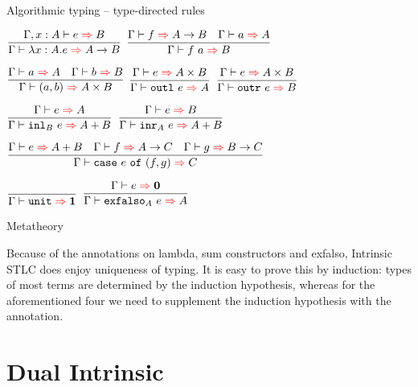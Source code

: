 \documentclass{beamer}
\newcommand{\Fun}[2]{#1 \to #2}
\newcommand{\Prod}[2]{#1 \times #2}
\newcommand{\Sum}[2]{#1 + #2}
\newcommand{\Unit}{\textbf{1}}
\newcommand{\Empty}{\textbf{0}}
\newcommand{\app}[2]{#1\ #2}
\newcommand{\pair}[2]{(#1, #2)}
\newcommand{\outl}[1][]{\texttt{outl}\ #1}
\newcommand{\outr}[1][]{\texttt{outr}\ #1}
\newcommand{\case}[3]{\texttt{case}\ #1\ \texttt{of}\ (#2, #3)}
\newcommand{\unit}{\texttt{unit}}
\newcommand{\infrule}[3][]{\displaystyle \frac{#2}{#3} \textsc{\footnotesize{#1}}}
\newcommand{\extend}[3]{#1, #2 : #3}
\begin{document}
\begin{frame}{Algorithmic typing -- type-directed rules}

\begin{center}
  $\infrule{\fullinfer{\extend{\Gamma}{x}{A}}{e}{B}}{\infer{\ifun{x}{A}{e}}{\Fun{A}{B}}}$ \quad
  $\infrule{\infer{f}{\Fun{A}{B}} \quad \infer{a}{A}}{\infer{\app{f}{a}}{B}}$

  \vspace{2em}

  $\infrule{\infer{a}{A} \quad \infer{b}{B}}{\infer{\pair{a}{b}}{\Prod{A}{B}}}$ \quad
  $\infrule{\infer{e}{\Prod{A}{B}}}{\infer{\outl[e]}{A}}$ \quad
  $\infrule{\infer{e}{\Prod{A}{B}}}{\infer{\outr[e]}{B}}$

  \vspace{2em}

  $\infrule{\infer{e}{A}}{\infer{\iinl{B}{e}}{\Sum{A}{B}}}$ \quad
  $\infrule{\infer{e}{B}}{\infer{\iinr{A}{e}}{\Sum{A}{B}}}$

  \vspace{2em}

  $\infrule{\infer{e}{\Sum{A}{B}} \quad \infer{f}{\Fun{A}{C}} \quad \infer{g}{\Fun{B}{C}}}{\infer{\case{e}{f}{g}}{C}}$

  \vspace{2em}

  $\infrule{}{\infer{\unit}{\Unit}}$ \quad
  $\infrule{\infer{e}{\Empty}}{\infer{\iexfalso{A}{e}}{A}}$
\end{center}

\end{frame}

\begin{frame}{Metatheory}

Because of the annotations on lambda, sum constructors and exfalso, Intrinsic STLC does enjoy uniqueness of typing. It is easy to prove this by induction: types of most terms are determined by the induction hypothesis, whereas for the aforementioned four we need to supplement the induction hypothesis with the annotation.

\end{frame}

\section{Dual Intrinsic}

\newcommand{\iapp}[3]{\texttt{app}_{#1}\ #2\ #3}
\newcommand{\ioutl}[2]{\texttt{outl}_{#1}\ #2}
\newcommand{\ioutr}[2]{\texttt{outr}_{#1}\ #2}
\newcommand{\icase}[5]{\texttt{case}_{#1, #2}\ #3\ \texttt{of}\ (#4, #5)}
\end{document}
